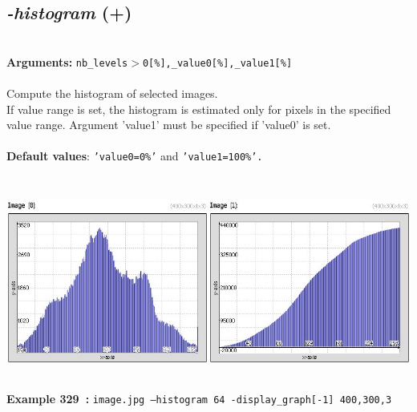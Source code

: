 \documentclass[a4paper,11pt,twoside]{book}
\begin{document}
\subsection{\emph{-histogram} (+)}\vspace*{-0.5em}
~\\\textbf{Arguments: } 
{\small \texttt{nb\_levels$>$0[\%],\_value0[\%],\_value1[\%]}}\\~\\
Compute the histogram of selected images.
~\\If value range is set, the histogram is estimated only for pixels in the specified
value range. Argument 'value1' must be specified if 'value0' is set.
~\\~\\\textbf{Default values}: {\small \texttt{'value0=0\%'} and \texttt{'value1=100\%'.}}
\begin{center}\includegraphics[keepaspectratio=true,height=7cm,width=\textwidth]{img/gmic_def329.jpg}\\
{\footnotesize \textbf{Example 329~:} \texttt{image.jpg --histogram 64 -display\_graph[-1] 400,300,3}}
\end{center}
\end{document}
